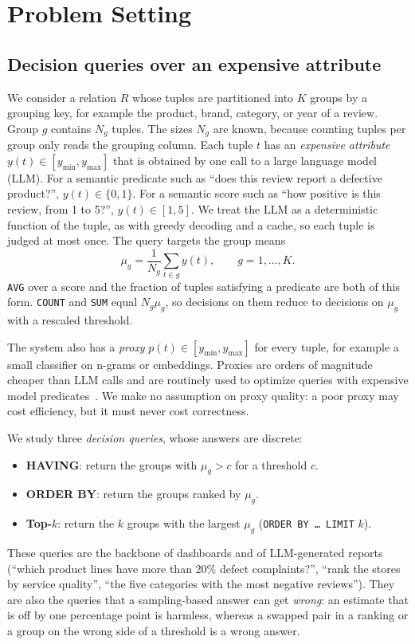 \section{Problem Setting}
\label{sec:problem}



\subsection{Decision queries over an expensive attribute}

We consider a relation $R$ whose tuples are partitioned into $K$ groups by a grouping key, for example the product, brand, category, or year of a review.
Group $g$ contains $N_g$ tuples.
The sizes $N_g$ are known, because counting tuples per group only reads the grouping column.
Each tuple $t$ has an \emph{expensive attribute} $y(t)\in[y_{\min},y_{\max}]$ that is obtained by one call to a large language model (LLM).
For a semantic predicate such as ``does this review report a defective product?'', $y(t)\in\{0,1\}$.
For a semantic score such as ``how positive is this review, from 1 to 5?'', $y(t)\in[1,5]$.
We treat the LLM as a deterministic function of the tuple, as with greedy decoding and a cache, so each tuple is judged at most once.
The query targets the group means
\begin{equation}
\mu_g=\frac{1}{N_g}\sum_{t\in g} y(t), \qquad g=1,\dots,K .
\end{equation}
\texttt{AVG} over a score and the fraction of tuples satisfying a predicate are both of this form.
\texttt{COUNT} and \texttt{SUM} equal $N_g\mu_g$, so decisions on them reduce to decisions on $\mu_g$ with a rescaled threshold.

The system also has a \emph{proxy} $p(t)\in[y_{\min},y_{\max}]$ for every tuple, for example a small classifier on n-grams or embeddings.
Proxies are orders of magnitude cheaper than LLM calls and are routinely used to optimize queries with expensive model predicates~\cite{blazeit,supg,abae,lotus,bargain}.
We make no assumption on proxy quality: a poor proxy may cost efficiency, but it must never cost correctness.

We study three \emph{decision queries}, whose answers are discrete:
\begin{itemize}
\item \textbf{HAVING}: return the groups with $\mu_g>c$ for a threshold $c$.
\item \textbf{ORDER BY}: return the groups ranked by $\mu_g$.
\item \textbf{Top-$k$}: return the $k$ groups with the largest $\mu_g$ (\texttt{ORDER BY \dots\ LIMIT} $k$).
\end{itemize}
These queries are the backbone of dashboards and of LLM-generated reports (``which product lines have more than 20\% defect complaints?'', ``rank the stores by service quality'', ``the five categories with the most negative reviews'').
They are also the queries that a sampling-based answer can get \emph{wrong}: an estimate that is off by one percentage point is harmless, whereas a swapped pair in a ranking or a group on the wrong side of a threshold is a wrong answer.

